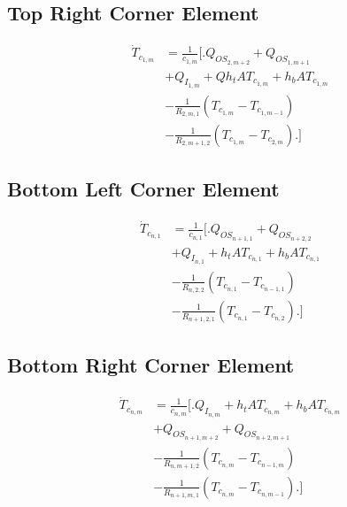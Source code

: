 \documentclass[10pt,twocolumn]{article}
\begin{document}
\subsection{Top Right Corner Element}
\begin{equation}
\begin{split}
\dot{T}_{c_{1,m}}	& = \frac{1}{c_{1,m}}
					\Biggl[\Biggr.
					 	  Q_{OS_{2,m+2}} + Q_{OS_{1,m+1}} \\
					& 	+ Q_{I_{1,m}}+ Qh_{t}AT_{c_{1,m}} + h_{b}AT_{c_{1,m}} \\
					&	- \frac{1}{R_{2,m,1}}\left(T_{c_{1,m}}- T_{c_{1,m-1}}\right) \\
					& 	- \frac{1}{R_{2,m+1,2}}\left(T_{c_{1,m}}- T_{c_{2,m}}\right)
					\Biggl.\Biggr]
\end{split}
\end{equation}

\subsection{Bottom Left Corner Element}
\begin{equation}
\begin{split}
\dot{T}_{c_{n,1}}	& = \frac{1}{c_{n,1}}
					\Biggl[\Biggr.
					 	  Q_{OS_{n+1,1}} + Q_{OS_{n+2,2}} \\
					& 	+ Q_{I_{n,1}}+ h_{t}AT_{c_{n,1}} + h_{b}AT_{c_{n,1}} \\
					&	- \frac{1}{R_{n,2,2}}\left(T_{c_{n,1}}- T_{c_{n-1,1}}\right) \\
					& 	- \frac{1}{R_{n+1,2,1}}\left(T_{c_{n,1}}- T_{c_{n,2}}\right) 
					\Biggl.\Biggr]
\end{split}
\end{equation}

\subsection{Bottom Right Corner Element}
\begin{equation}
\begin{split}
\dot{T}_{c_{n,m}}	& = \frac{1}{c_{n,m}}
					\Biggl[\Biggr.
						  Q_{I_{n,m}}+ h_{t}AT_{c_{n,m}} + h_{b}AT_{c_{n,m}} \\
					&	+ Q_{OS_{n+1,m+2}} + Q_{OS_{n+2,m+1}} \\
					&	- \frac{1}{R_{n,m+1,2}}\left(T_{c_{n,m}}- T_{c_{n-1,m}}\right) \\
					& 	- \frac{1}{R_{n+1,m,1}}\left(T_{c_{n,m}}- T_{c_{n,m-1}}\right)
					\Biggl.\Biggr]
\end{split}  
\end{equation}
\end{document}
